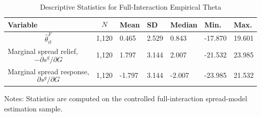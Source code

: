 \begin{table}[H]\centering
\begin{threeparttable}
\caption{Descriptive Statistics for Full-Interaction Empirical Theta}
\label{tab:theta_descriptive_stats}
\scriptsize
\begin{tabularx}{\textwidth}{lYYYYYY}
\toprule
Variable & $$N$$ & Mean & SD & Median & Min. & Max. \\
\midrule
$$\widehat{\theta}^{F}_{it}$$ & 1,120 & 0.465 & 2.529 & 0.843 & -17.870 & 19.601 \\
Marginal spread relief, $$-\partial s^g/\partial G$$ & 1,120 & 1.797 & 3.144 & 2.007 & -21.532 & 23.985 \\
Marginal spread response, $$\partial s^g/\partial G$$ & 1,120 & -1.797 & 3.144 & -2.007 & -23.985 & 21.532 \\
\bottomrule
\end{tabularx}
\begin{tablenotes}[flushleft]\footnotesize
\item Notes: Statistics are computed on the controlled full-interaction spread-model estimation sample.
\end{tablenotes}
\end{threeparttable}
\end{table}
